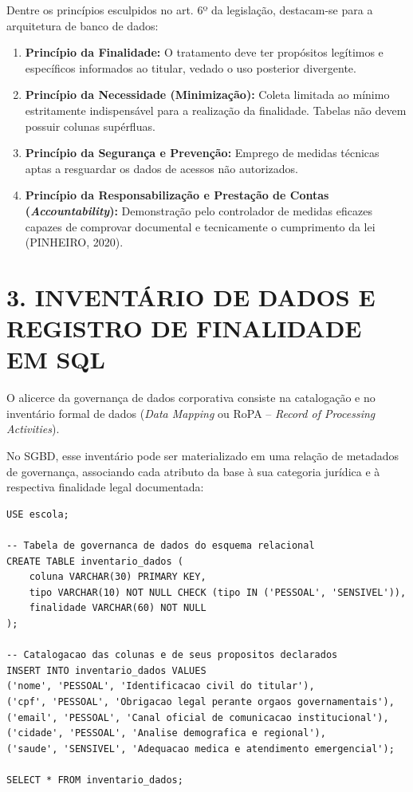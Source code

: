 Dentre os princípios esculpidos no art. 6º da legislação, destacam-se para a arquitetura de banco de dados:
\begin{enumerate}
    \item \textbf{Princípio da Finalidade:} O tratamento deve ter propósitos legítimos e específicos informados ao titular, vedado o uso posterior divergente.
    \item \textbf{Princípio da Necessidade (Minimização):} Coleta limitada ao mínimo estritamente indispensável para a realização da finalidade. Tabelas não devem possuir colunas supérfluas.
    \item \textbf{Princípio da Segurança e Prevenção:} Emprego de medidas técnicas aptas a resguardar os dados de acessos não autorizados.
    \item \textbf{Princípio da Responsabilização e Prestação de Contas (\textit{Accountability}):} Demonstração pelo controlador de medidas eficazes capazes de comprovar documental e tecnicamente o cumprimento da lei (PINHEIRO, 2020).
\end{enumerate}

\newpage

\section*{3. INVENTÁRIO DE DADOS E REGISTRO DE FINALIDADE EM SQL}

O alicerce da governança de dados corporativa consiste na catalogação e no inventário formal de dados (\textit{Data Mapping} ou RoPA -- \textit{Record of Processing Activities}).

No SGBD, esse inventário pode ser materializado em uma relação de metadados de governança, associando cada atributo da base à sua categoria jurídica e à respectiva finalidade legal documentada:

\begin{lstlisting}
USE escola;

-- Tabela de governanca de dados do esquema relacional
CREATE TABLE inventario_dados (
    coluna VARCHAR(30) PRIMARY KEY,
    tipo VARCHAR(10) NOT NULL CHECK (tipo IN ('PESSOAL', 'SENSIVEL')),
    finalidade VARCHAR(60) NOT NULL
);

-- Catalogacao das colunas e de seus propositos declarados
INSERT INTO inventario_dados VALUES
('nome', 'PESSOAL', 'Identificacao civil do titular'),
('cpf', 'PESSOAL', 'Obrigacao legal perante orgaos governamentais'),
('email', 'PESSOAL', 'Canal oficial de comunicacao institucional'),
('cidade', 'PESSOAL', 'Analise demografica e regional'),
('saude', 'SENSIVEL', 'Adequacao medica e atendimento emergencial');

SELECT * FROM inventario_dados;
\end{lstlisting}

